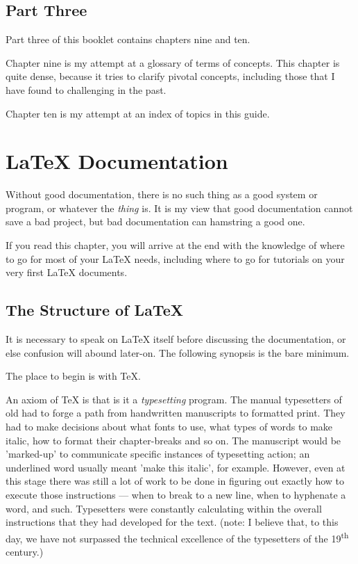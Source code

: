 \documentclass[12pt, oneside]{memoir}
\begin{document}
\section*{Part Three}
Part three of this booklet contains chapters nine and ten.

Chapter nine is my attempt at a glossary of terms of concepts. This chapter is quite dense, because it tries to clarify pivotal concepts, including those that I have found to challenging in the past. 

Chapter ten is my attempt at an index of topics in this guide.

\chapter{\LaTeX{} Documentation}
Without good documentation, there is no such thing as a good system or program, or whatever the \emph{thing} is. It is my view that good documentation cannot save a bad project, but bad documentation can hamstring a good one.

If you read this chapter, you will arrive at the end with the knowledge of where to go for most of your \LaTeX{} needs, including where to go for tutorials on your very first \LaTeX{} documents.

\section*{The Structure of \LaTeX{}}

It is necessary to speak on LaTeX itself before discussing the documentation, or else confusion will abound later-on. The following synopsis is the bare minimum.

The place to begin is with \TeX{}.

An axiom of \TeX{} is that is it a \emph{typesetting} program. The manual typesetters of old had to forge a path from handwritten manuscripts to formatted print. They had to make decisions about what fonts to use, what types of words to make italic, how to format their chapter-breaks and so on. The manuscript would be 'marked-up' to communicate specific instances of typesetting action; an underlined word usually meant 'make this italic', for example. However, even at this stage there was still a lot of work to be done in figuring out exactly how to execute those instructions — when to break to a new line, when to hyphenate a word, and such. Typesetters were constantly calculating within the overall instructions that they had developed for the text. (note: I believe that, to this day, we have not surpassed the technical excellence of the typesetters of the 19\textsuperscript{th} century.)
\end{document}
